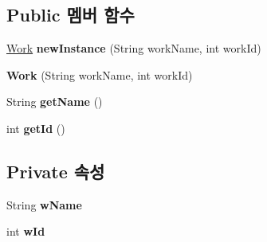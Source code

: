 \subsection*{Public 멤버 함수}
\begin{DoxyCompactItemize}
\item 
\hypertarget{classkookmin_1_1cs_1_1homeflow_1_1data_1_1_workflow_1_1_work_afe3587469c681483da0b2881fe2b03bd}{}\hyperlink{classkookmin_1_1cs_1_1homeflow_1_1data_1_1_workflow_1_1_work}{Work} {\bfseries new\+Instance} (String work\+Name, int work\+Id)\label{classkookmin_1_1cs_1_1homeflow_1_1data_1_1_workflow_1_1_work_afe3587469c681483da0b2881fe2b03bd}

\item 
\hypertarget{classkookmin_1_1cs_1_1homeflow_1_1data_1_1_workflow_1_1_work_a884e351e82d281343e03cc90d9dab30a}{}{\bfseries Work} (String work\+Name, int work\+Id)\label{classkookmin_1_1cs_1_1homeflow_1_1data_1_1_workflow_1_1_work_a884e351e82d281343e03cc90d9dab30a}

\item 
\hypertarget{classkookmin_1_1cs_1_1homeflow_1_1data_1_1_workflow_1_1_work_afe184c07ba88058ba213fc98e1f85375}{}String {\bfseries get\+Name} ()\label{classkookmin_1_1cs_1_1homeflow_1_1data_1_1_workflow_1_1_work_afe184c07ba88058ba213fc98e1f85375}

\item 
\hypertarget{classkookmin_1_1cs_1_1homeflow_1_1data_1_1_workflow_1_1_work_aea5128d4e754d459b8ca05fc5b866194}{}int {\bfseries get\+Id} ()\label{classkookmin_1_1cs_1_1homeflow_1_1data_1_1_workflow_1_1_work_aea5128d4e754d459b8ca05fc5b866194}

\end{DoxyCompactItemize}
\subsection*{Private 속성}
\begin{DoxyCompactItemize}
\item 
\hypertarget{classkookmin_1_1cs_1_1homeflow_1_1data_1_1_workflow_1_1_work_ad3f6072bc6ef8d0b20def5a61a93d7e7}{}String {\bfseries w\+Name}\label{classkookmin_1_1cs_1_1homeflow_1_1data_1_1_workflow_1_1_work_ad3f6072bc6ef8d0b20def5a61a93d7e7}

\item 
\hypertarget{classkookmin_1_1cs_1_1homeflow_1_1data_1_1_workflow_1_1_work_abd2d4f235e90c1b2e51c16d211cd6f5e}{}int {\bfseries w\+Id}\label{classkookmin_1_1cs_1_1homeflow_1_1data_1_1_workflow_1_1_work_abd2d4f235e90c1b2e51c16d211cd6f5e}

\end{DoxyCompactItemize}


